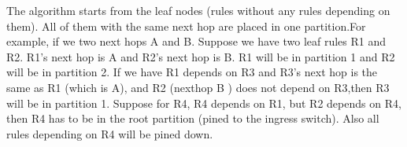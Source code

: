 The algorithm starts from the leaf nodes (rules without any rules depending on
them). All of them with the same next hop are placed in one partition.For
example, if we two next hops A and B. Suppose we have two leaf rules R1 and
R2. R1's next hop is A and R2's next hop is B. R1 will be in partition 1 and R2
will be in partition 2.  
If we have R1 depends on R3 and R3's next hop is the same as R1 (which is A),
and R2 (nexthop B ) does not depend on R3,then R3 will be in partition 1.  
Suppose for R4, R4 depends on R1, but R2 depends on R4, then R4 has to be in the
root partition (pined to the ingress switch). Also all rules depending on R4
will be pined down. 
\fi

